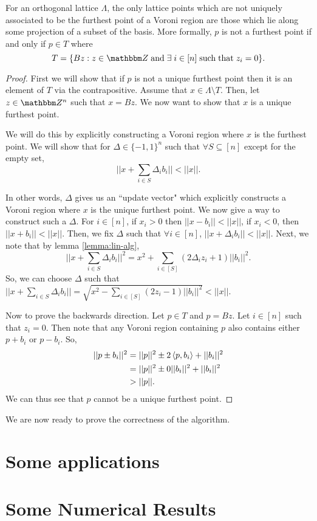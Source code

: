\documentclass[12pt]{article}
\begin{document}
\begin{theorem}
	For an orthogonal lattice $\Lambda$, the only lattice points which are not uniquely associated to be the furthest point of a Voroni region are those which lie along some projection of a subset of the basis. More formally, $p$ is not a furthest point if and only if
	$p \in T$
	where 
	$$
		T = \{ Bz : z \in \Z\;\mathrm{ and }\;\exists\; i \in [n]\; \mathrm{such \; that}\; z_i = 0\}.
	$$
	\begin{proof}
		First we will show that if $p$ is not a unique furthest point then it is an element of $T$ via the contrapositive.
		Assume that $x \in \Lambda \setminus T$. 
		Then, let $z \in \Z^n$ such that $x = Bz$.
		We now want to show that $x$ is a unique furthest point.

		We will do this by explicitly constructing a Voroni region where $x$ is the furthest point.
		We will show that for $\Delta \in \{-1, 1\}^n$ such that $\forall S \subseteq [n]$ except for the empty set, 
		$$
		||x + \sum_{i \in S} \Delta_i b_i|| < ||x||.
		$$

		In other words, $\Delta$ gives us an ``update vector" which explicitly constructs a Voroni region where $x$ is the unique furthest point. We now give a way to construct such a $\Delta$. 
		For $i \in [n]$, if $x_i > 0$ then $||x - b_i|| < ||x||$,
		if $x_i < 0$, then $||x + b_i|| < ||x||$.
		Then, we fix $\Delta$ such that $\forall i \in [n]$, $||x + \Delta_i b_i|| < ||x||$.
		Next, we note that by lemma \ref{lemma:lin-alg},
		$$
		||x + \sum_{i \in S} \Delta_i b_i||^2 = x^2 + \sum_{i \in [S]} (2\Delta_i z_i + 1)||b_i||^2.
		$$
		So, we can choose $\Delta$ such that
		$||x + \sum_{i \in S} \Delta_i b_i|| = \sqrt{x^2 - \sum_{i \in [S]} (2 z_i - 1)||b_i||^2} < ||x||.$


		Now to prove the backwards direction.
		Let $p \in T$ and $p = Bz$. Let $i \in [n]$ such that $z_i = 0$.
		Then note that any Voroni region containing $p$ also contains either $p + b_i$ or $p - b_i$.
		So,
		\begin{align*}
			||p \pm b_i||^2 &= ||p||^2 \pm 2\braket{ p,  b_i } + ||b_i||^2\\
			&= ||p||^2 \pm 0 ||b_i||^2 + ||b_i||^2 \\
			&> ||p||.
		\end{align*}
		We can thus see that $p$ cannot be a unique furthest point.


	\end{proof}
\end{theorem}

We are now ready to prove the correctness of the algorithm.

\section*{Some applications}

\section*{Some Numerical Results}
\end{document}
